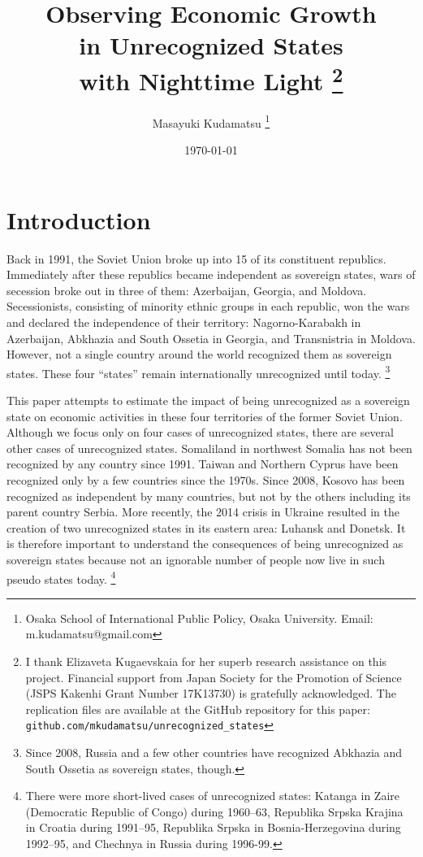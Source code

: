 \documentclass[12pt,a4paper]{article}%
\begin{document}
\cprotect\title{
	Observing Economic Growth \\in Unrecognized States \\with Nighttime Light 
	\cprotect\thanks{%
		I thank Elizaveta Kugaevskaia for her superb research assistance on this project. 
		Financial support from Japan Society for the Promotion of Science (JSPS Kakenhi Grant Number 17K13730) is gratefully acknowledged. 
		The replication files are available at the GitHub repository for this paper: \verb!github.com/mkudamatsu/unrecognized_states!
		} 
	}
\author{Masayuki Kudamatsu \thanks{Osaka School of International Public Policy, Osaka University. Email: m.kudamatsu@gmail.com}}
\date{\today}
\maketitle

\section{Introduction}
Back in 1991, the Soviet Union broke up into 15 of its constituent republics. 
Immediately after these republics became independent as sovereign states, wars of secession broke out in three of them: Azerbaijan, Georgia, and Moldova. 
Secessionists, consisting of minority ethnic groups in each republic, won the wars and declared the independence of their territory: Nagorno-Karabakh in Azerbaijan, Abkhazia and South Ossetia in Georgia, and Transnistria in Moldova. 
However, not a single country around the world recognized them as sovereign states. 
These four ``states'' remain internationally unrecognized until today.%
\footnote{%
	Since 2008, Russia and a few other countries have recognized Abkhazia and South Ossetia as sovereign states, though.
} 

This paper attempts to estimate the impact of being unrecognized as a sovereign state on economic activities in these four territories of the former Soviet Union. 
Although we focus only on four cases of unrecognized states, there are several other cases of unrecognized states.
Somaliland in northwest Somalia has not been recognized by any country since 1991. 
Taiwan and Northern Cyprus have been recognized only by a few countries since the 1970s. 
Since 2008, Kosovo has been recognized as independent by many countries, but not by the others including its parent country Serbia.
More recently, the 2014 crisis in Ukraine resulted in the creation of two unrecognized states in its eastern area: Luhansk and Donetsk.
It is therefore important to understand the consequences of being unrecognized as sovereign states because not an ignorable number of people now live in such pseudo states today.%
\footnote{
	There were more short-lived cases of unrecognized states: Katanga in Zaire (Democratic Republic of Congo) during 1960--63, Republika Srpska Krajina in Croatia during 1991--95, Republika Srpska in Bosnia-Herzegovina during 1992--95, and Chechnya in Russia during 1996-99.
	}
\end{document}
